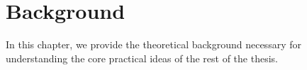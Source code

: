 \chapter{Background} \label{chapter:background}

In this chapter, we provide the theoretical background necessary for
understanding the core practical ideas of the rest of the thesis.








